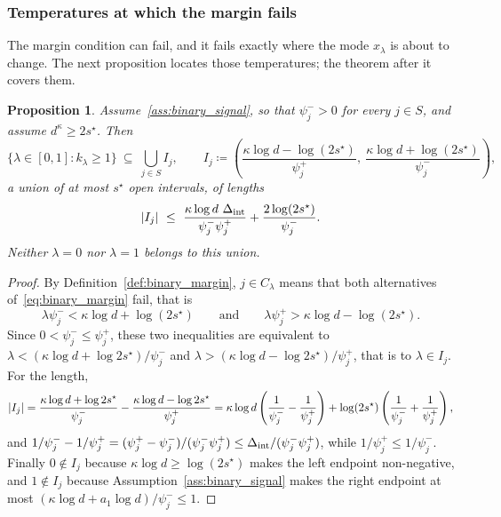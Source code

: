 \documentclass[aos]{imsart}%
\DeclarePairedDelimiter{\abs}{\lvert}{\rvert}
\theoremstyle{plain}
\newtheorem{proposition}{Proposition}[section]
\theoremstyle{definition}
\begin{document}
    \subsubsection{Temperatures at which the margin fails}

    The margin condition can fail, and it fails exactly where the mode
    $\hat x_\lambda$ is about to change. The next proposition locates those
    temperatures; the theorem after it covers them.

    \begin{proposition}
        \label{prop:binary_badset}
        Assume~\ref{ass:binary_signal}, so that $\psi_j^{-}>0$ for every
        $j\in S$, and assume $d^{\kappa}\geq2s^{\star}$. Then
        \begin{equation*}
            \{\lambda\in[0,1]:k_\lambda\geq1\}
            \ \subseteq\ \bigcup_{j\in S}I_j,
            \qquad
            I_j\coloneq\left(\frac{\kappa\log d-\log(2s^{\star})}{\psi_j^{+}},
            \ \frac{\kappa\log d+\log(2s^{\star})}{\psi_j^{-}}\right),
        \end{equation*}
        a union of at most $s^{\star}$ open intervals, of lengths
        \begin{equation*}
            \abs{I_j}\ \leq\ \frac{\kappa\log d\ \Spread}
            {\psi_j^{-}\psi_j^{+}}+\frac{2\log(2s^{\star})}{\psi_j^{-}} .
        \end{equation*}
        Neither $\lambda=0$ nor $\lambda=1$ belongs to this union.
    \end{proposition}

    \begin{proof}
        By Definition~\ref{def:binary_margin}, $j\in C_\lambda$ means that both
        alternatives of~\eqref{eq:binary_margin} fail, that is
        \begin{equation*}
            \lambda\psi_j^{-}<\kappa\log d+\log(2s^{\star})
            \qquad\text{and}\qquad
            \lambda\psi_j^{+}>\kappa\log d-\log(2s^{\star}).
        \end{equation*}
        Since $0<\psi_j^{-}\leq\psi_j^{+}$, these two inequalities are
        equivalent to $\lambda<(\kappa\log d+\log2s^{\star})/\psi_j^{-}$ and
        $\lambda>(\kappa\log d-\log2s^{\star})/\psi_j^{+}$, that is to
        $\lambda\in I_j$. For the length,
        \begin{equation*}
            \abs{I_j}=\frac{\kappa\log d+\log2s^{\star}}{\psi_j^{-}}
            -\frac{\kappa\log d-\log2s^{\star}}{\psi_j^{+}}
            =\kappa\log d\left(\frac{1}{\psi_j^{-}}-\frac{1}{\psi_j^{+}}\right)
            +\log(2s^{\star})\left(\frac{1}{\psi_j^{-}}
            +\frac{1}{\psi_j^{+}}\right),
        \end{equation*}
        and $1/\psi_j^{-}-1/\psi_j^{+}=(\psi_j^{+}-\psi_j^{-})/
        (\psi_j^{-}\psi_j^{+})\leq\Delta_{\mathrm{int}}/(\psi_j^{-}\psi_j^{+})$, while
        $1/\psi_j^{+}\leq1/\psi_j^{-}$. Finally $0\notin I_j$ because
        $\kappa\log d\geq\log(2s^{\star})$ makes the left endpoint
        non-negative, and $1\notin I_j$ because
        Assumption~\ref{ass:binary_signal} makes the right endpoint at most
        $(\kappa\log d+a_1\log d)/\psi_j^{-}\leq1$.
    \end{proof}
\end{document}
